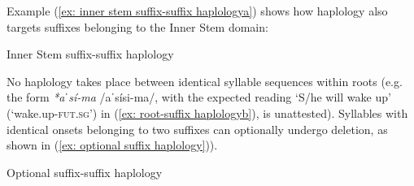Example (\ref{ex: inner stem suffix-suffix haplologya}) shows how haplology also targets suffixes belonging to the Inner Stem domain:

\ea\label{ex: inner stem suffix-suffix haplology}
Inner Stem suffix-suffix haplology

    \label{ex: inner stem suffix-suffix haplologya}
        \label{ex: inner stem suffix-suffix haplologyb}
    \z
\z

No haplology takes place between identical syllable sequences within roots (e.g. the form \textit{*aˈsí-ma} /aˈsísi-ma/, with the expected reading `S/he will wake up' (‘wake.up-\textsc{fut.sg}’) in (\ref{ex: root-suffix haplologyb}), is unattested). Syllables with identical onsets belonging to two suffixes can optionally undergo deletion, as shown in (\ref{ex: optional suffix haplology})).

\ea\label{ex: optional suffix haplology}
{Optional suffix-suffix haplology}

    \z
\z

